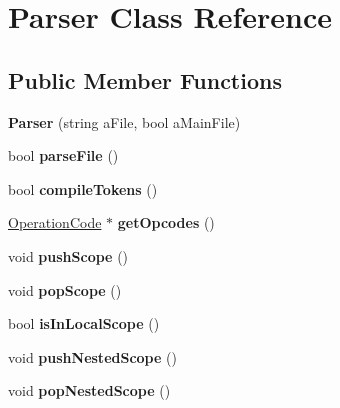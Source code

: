 \hypertarget{a00017}{\section{Parser Class Reference}
\label{a00017}
}
\subsection*{Public Member Functions}
\begin{DoxyCompactItemize}
\item 
\hypertarget{a00017_a035c46274311501757564dfbaf052f2d}{{\bfseries Parser} (string a\+File, bool a\+Main\+File)}\label{a00017_a035c46274311501757564dfbaf052f2d}

\item 
\hypertarget{a00017_af06133bfc45c2a15c3742c31c1f226c4}{bool {\bfseries parse\+File} ()}\label{a00017_af06133bfc45c2a15c3742c31c1f226c4}

\item 
\hypertarget{a00017_ae536c7f606706a84ff08ce69cb3b5711}{bool {\bfseries compile\+Tokens} ()}\label{a00017_ae536c7f606706a84ff08ce69cb3b5711}

\item 
\hypertarget{a00017_a31b193c27eae5bb43de8921f94ba2707}{\hyperlink{a00015}{Operation\+Code} $\ast$ {\bfseries get\+Opcodes} ()}\label{a00017_a31b193c27eae5bb43de8921f94ba2707}

\item 
\hypertarget{a00017_aac2d2e20c5477b9520cfacd9088f1bee}{void {\bfseries push\+Scope} ()}\label{a00017_aac2d2e20c5477b9520cfacd9088f1bee}

\item 
\hypertarget{a00017_aa249068b5c9f7deb72915e0c25a3d405}{void {\bfseries pop\+Scope} ()}\label{a00017_aa249068b5c9f7deb72915e0c25a3d405}

\item 
\hypertarget{a00017_a0fec5d464e3f94885418b809ae126238}{bool {\bfseries is\+In\+Local\+Scope} ()}\label{a00017_a0fec5d464e3f94885418b809ae126238}

\item 
\hypertarget{a00017_aafd539cf018fb72657fcf913cc2d9532}{void {\bfseries push\+Nested\+Scope} ()}\label{a00017_aafd539cf018fb72657fcf913cc2d9532}

\item 
\hypertarget{a00017_ace4796e2e5308d3190734359cfb1ae54}{void {\bfseries pop\+Nested\+Scope} ()}\label{a00017_ace4796e2e5308d3190734359cfb1ae54}


\end{DoxyCompactItemize}
